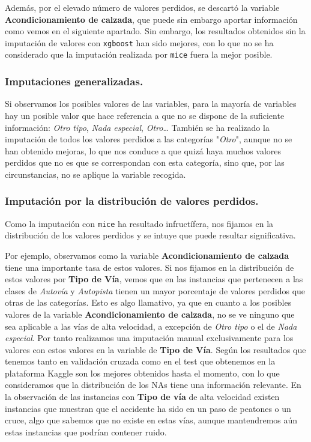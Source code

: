 \documentclass[11pt]{article}
\begin{document}
Además, por el elevado número de valores perdidos, se descartó la
variable \textbf{Acondicionamiento de calzada}, que puede sin embargo aportar
información como vemos en el siguiente apartado.
Sin embargo, los resultados obtenidos sin la imputación de valores con
\texttt{xgboost} han sido mejores, con lo que no se ha considerado que la
imputación realizada por \texttt{mice} fuera la mejor posible.

\subsubsection{Imputaciones generalizadas.}
\label{sec:org1c7be6f}

Si observamos los posibles valores de las variables, para la mayoría
de variables hay un posible valor que hace referencia a que no se
dispone de la suficiente información: \emph{Otro tipo}, \emph{Nada especial},
\emph{Otro}\ldots{} También se ha realizado la imputación de todos los valores
perdidos a las categorías "\emph{Otro}", aunque no se han obtenido mejoras,
lo que nos conduce a que quizá haya muchos valores perdidos que no es
que se correspondan con esta categoría, sino que, por las
circunstancias, no se aplique la variable recogida. 

\subsubsection{Imputación por la distribución de valores perdidos.}
\label{sec:orgf04b8f2}

Como la imputación con \texttt{mice} ha resultado infructífera, nos fijamos
en la distribución de los valores perdidos y se intuye que puede
resultar significativa. 

Por ejemplo, observamos como la variable \textbf{Acondicionamiento de
calzada} tiene una importante tasa de estos valores. Si nos fijamos en
la distribución de estos valores por \textbf{Tipo de Vía}, vemos que en las
instancias que pertenecen a las clases de \emph{Autovía} y \emph{Autopista}
tienen un mayor porcentaje de valores perdidos que otras de las
categorías. Esto es algo llamativo, ya que en cuanto a los posibles
valores de la variable \textbf{Acondicionamiento de calzada}, no se ve
ninguno que sea aplicable a las vías de alta velocidad, a excepción de
\emph{Otro tipo} o el de \emph{Nada especial}. Por tanto realizamos una
imputación manual exclusivamente para los valores con estos valores en
la variable de \textbf{Tipo de Vía}. Según los resultados que tenemos tanto
en validación cruzada como en el test que obtenemos en la plataforma
Kaggle son los mejores obtenidos hasta el momento, con lo que
consideramos que la distribución de los NAs tiene una información
relevante. En la observación de las instancias con \textbf{Tipo de vía} de
alta velocidad existen instancias que muestran que el accidente ha
sido en un paso de peatones o un cruce, algo que sabemos que no existe
en estas vías, aunque mantendremos aún estas instancias que podrían
contener ruido.
\end{document}

